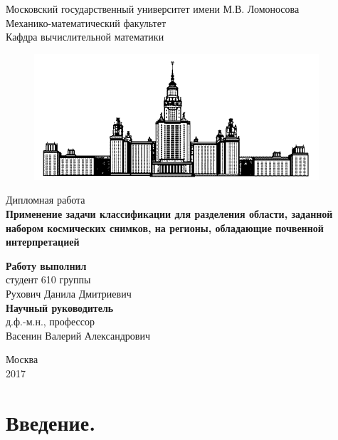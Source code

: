 \documentclass[14pt]{extarticle}
\begin{document}
\thispagestyle{empty}
{\centering Московский государственный университет имени М.В. Ломоносова \\}
{\centering Механико-математический факультет \\}
{\centering Кафдра вычислительной математики \\}
\begin{figure}[H]
\centering
\includegraphics[width=0.4\linewidth]{imgs/msu.png}
\end{figure}
\vspace*{0.5cm}
{\centering Дипломная работа \\}
\vspace*{1.5cm}
{\centering \textbf{\large Применение задачи классификации для разделения
области, заданной набором космических снимков, на регионы, обладающие почвенной
интерпретацией} \\}
\vspace*{1.5cm}
\begin{flushright}
\textbf{Работу выполнил \\}
студент 610 группы \\
Рухович Данила Дмитриевич \\
\vspace*{0.5cm}
\textbf{Научный руководитель \\}
д.ф.-м.н., профессор \\
Васенин Валерий Александрович \\
\end{flushright}
\vspace*{4.5cm}
{\centering Москва \\ 2017 \\}

\newpage

\tableofcontents
\newpage

\section{Введение.}
\end{document}
